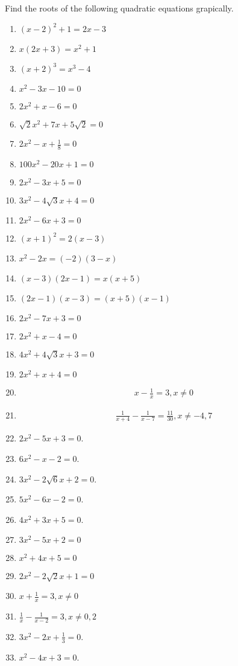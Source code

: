 Find the roots of the following quadratic  equations grapically.
\begin{enumerate}[label=\thesubsection.\arabic*,ref=\thesubsection.\theenumi]
\item $(x-2)^2+1=2x-3$
\item $x(2x+3) = x^2+1$
\item $(x+2)^3 = x^3-4$
\item $x^2-3x-10=0$
\item $2x^2+x-6=0$
\item $ \sqrt 2x^2+7x+5 \sqrt 2=0$
\item $2x^2-x+\frac{1}{8}=0$
\item $100x^2-20x+1=0$
\item $2x^2-3x+5=0$
\item $3x^2-4 \sqrt 3x+4=0$
\item $2x^2-6x+3=0$
\item $(x+1)^2=2(x-3)$
\item $x^2-2x=(-2)(3-x)$
\item $(x-3)(2x-1)=x(x+5)$
\item $(2x-1)(x-3)=(x+5)(x-1)$
\item
$2x^2-7x+3=0$
\item
$2x^2+x-4=0$
\item
$4x^2+4\sqrt 3x+3=0$
\item
$2x^2+x+4=0$
\item
\begin{align}
x-\frac{1}{x}=3, x\neq{0}
\end{align}
\item
\begin{align}
\frac{1}{x+4}-\frac{1}{x-7}=\frac{11}{30}, x\neq{-4,7}
\end{align}
\item $2x^2 -5x+3 = 0$.
\item $6x^2 -x-2 = 0$.
\item $3x^2 -2\sqrt6x+2 = 0$.
\item $5x^2-6x-2 = 0$. 
\item $4x^2+3x+5 = 0$. 
\item $3x^2-5x+2 = 0$
\item $x^2+4x+5 = 0$
\item $2x^2-2\sqrt 2x+1 = 0$
\item $x+\frac{1}{x} = 3,x\neq0$
\item $\frac{1}{x}-\frac{1}{x-2} = 3, x\neq 0,2$
\item $3x^2-2x+\frac{1}{3} = 0$. 
\item $x^2-4x+3 = 0$.
\end{enumerate}
